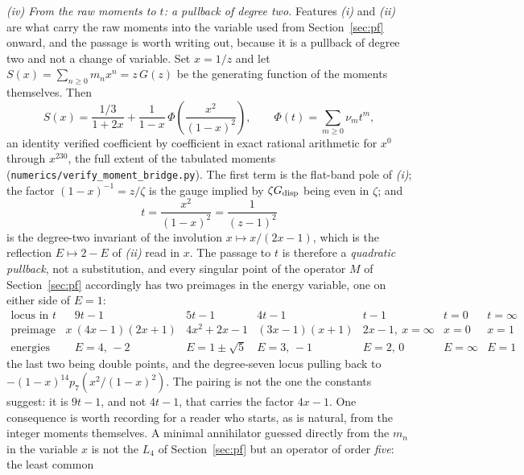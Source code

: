 \documentclass[cntp]{ipart}
\theoremstyle{plain}
\theoremstyle{remark}
\begin{document}
\emph{(iv) From the raw moments to $t$: a pullback of degree two.} Features \emph{(i)} and \emph{(ii)} are what
carry the raw moments into the variable used from Section~\ref{sec:pf} onward, and the passage is worth writing
out, because it is a pullback of degree two and not a change of variable. Set $x=1/z$ and let
$S(x)=\sum_{n\ge0}m_nx^n=z\,G(z)$ be the generating function of the moments themselves. Then
\begin{equation}
S(x)=\frac{1/3}{1+2x}+\frac{1}{1-x}\,\Phi\!\left(\frac{x^{2}}{(1-x)^{2}}\right),
\qquad \Phi(t)=\sum_{m\ge0}\nu_m t^m,
\label{eq:momentbridge}
\end{equation}
an identity verified coefficient by coefficient in exact rational arithmetic for $x^{0}$ through $x^{230}$, the
full extent of the tabulated moments (\texttt{numerics/verify\_moment\_bridge.py}). The first term is the
flat-band pole of \emph{(i)}; the factor $(1-x)^{-1}=z/\zeta$ is the gauge implied by $\zeta G_{\rm disp}$ being
even in $\zeta$; and
\begin{equation}
t=\frac{x^{2}}{(1-x)^{2}}=\frac{1}{(z-1)^{2}}
\label{eq:tofx}
\end{equation}
is the degree-two invariant of the involution $x\mapsto x/(2x-1)$, which is the reflection $E\mapsto2-E$ of
\emph{(ii)} read in $x$. The passage to $t$ is therefore a \emph{quadratic pullback}, not a substitution, and
every singular point of the operator $M$ of Section~\ref{sec:pf} accordingly has two preimages in the energy
variable, one on either side of $E=1$:
{\small\setlength{\arraycolsep}{3pt}%
\begin{equation}
\begin{array}{c|cccccc}
\text{locus in }t & 9t-1 & 5t-1 & 4t-1 & t-1 & t=0 & t=\infty\\\hline
\text{preimage in }x & (4x-1)(2x+1) & 4x^{2}+2x-1 & (3x-1)(x+1) & 2x-1,\ x=\infty & x=0 & x=1\\
\text{energies} & E=4,\,-2 & E=1\pm\sqrt5 & E=3,\,-1 & E=2,\,0 & E=\infty & E=1
\end{array}
\label{eq:branches}
\end{equation}}%
the last two being double points, and the degree-seven locus pulling back to
$-(1-x)^{14}p_7\!\left(x^{2}/(1-x)^{2}\right)$. The pairing is not the one the constants suggest: it is $9t-1$,
and not $4t-1$, that carries the factor $4x-1$. One consequence is worth recording for a reader who starts, as
is natural, from the integer moments themselves. A minimal annihilator guessed directly from the $m_n$ in the
variable $x$ is not the $L_4$ of Section~\ref{sec:pf} but an operator of order \emph{five}: the least common
\end{document}
